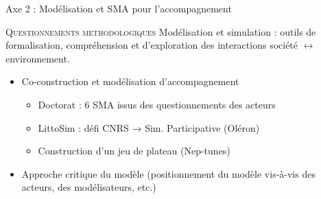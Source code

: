 \documentclass[newPxFont]{beamer}
\begin{document}
\begin{frame}{Axe 2 : Modélisation et SMA pour l'accompagnement}
	\vspace{-2em}
	\small{
		\begin{alertblock}{\textsc{Questionnements methodologiques}}
				Modélisation et simulation : outils de \alert{formalisation}, \alert{compréhension} et d'\alert{exploration} des interactions société $\leftrightarrow$ environnement.
		\end{alertblock}
	}
  \vspace{-1em}
	\begin{itemize}
		\item Co-construction et modélisation d'accompagnement
		\begin{itemize}
			\item Doctorat : 6 SMA issus des questionnements des acteurs
			\item LittoSim : défi CNRS → Sim. Participative (Oléron)
      \item Construction d'un jeu de plateau (Nep-tunes)
		\end{itemize}
		\item Approche critique du modèle (positionnement du modèle vis-à-vis des acteurs, des modélisateurs, etc.)
	\end{itemize}
  \vspace{-1em}
	\begin{figure}
 			\centering
	\end{figure}

\end{frame}
\end{document}

